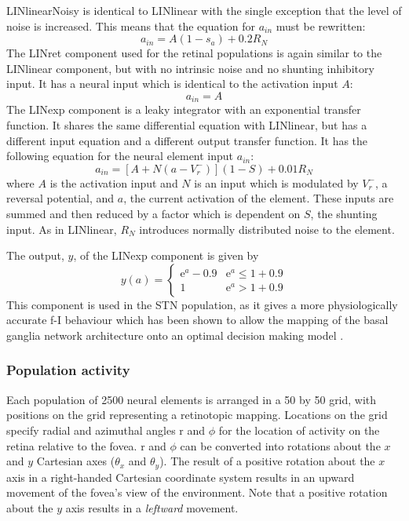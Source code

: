 \documentclass{frontiersSCNS}
\begin{document}
LINlinearNoisy is identical to LINlinear with the single exception
that the level of noise is increased. This means that the equation for
$a_{in}$ must be rewritten:
\[
   a_{in} = A(1-s_a)+0.2 R_N
\]
The LINret component used for the retinal populations is again similar
to the LINlinear component, but with no intrinsic noise and no
shunting inhibitory input. It has a neural input which is identical to
the activation input $A$:
\[
   a_{in} = A
\]
The LINexp component is a leaky integrator with an exponential
transfer function. It shares the same differential equation with
LINlinear, but has a different input equation and a different output
transfer function. It has the following equation for the neural
element input $a_{in}$:
\[
   a_{in} = [A+N(a-V_{r}^{-})] (1-S) + 0.01 R_N
\]
where $A$ is the activation input and $N$ is an input which is
modulated by $V_{r}^{-}$, a reversal potential, and $a$, the current
activation of the element. These inputs are summed and then reduced by
a factor which is dependent on $S$, the shunting input. As in
LINlinear, $R_N$ introduces normally distributed noise to the element.

The output, $y$, of the LINexp component is given by
\[
   y(a) = \begin{cases}
      \mathrm{e}^{a}-0.9   & \mathrm{e}^a \leq 1+0.9 \\
      1   & \mathrm{e}^a > 1+0.9
   \end{cases}
\]
This component is used in the STN population, as it gives a more
physiologically accurate f-I
behaviour 
which has been shown to allow the mapping of the basal ganglia network
architecture onto an optimal decision making
model .

%
%

\subsubsection{Population activity}

Each population of 2500 neural elements is arranged in a 50 by 50
grid, with positions on the grid representing a retinotopic
mapping. Locations on the grid specify radial and azimuthal angles r
and $\phi$ for the location of activity on the retina relative to the
fovea. r and $\phi$ can be converted into rotations about the $x$ and
$y$ Cartesian axes ($\theta_x$ and $\theta_y$). The result of a
positive rotation about the $x$ axis in a right-handed Cartesian
coordinate system results in an upward movement of the fovea's view
of the environment. Note that a positive rotation about the $y$ axis
results in a \emph{leftward} movement.
\end{document}

